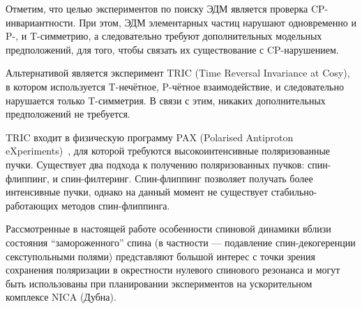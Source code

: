 
Отметим, что целью экспериментов по поиску ЭДМ является проверка CP-инвариантности. При этом, ЭДМ элементарных частиц нарушают одновременно и P-, и T-симметрию, а следовательно требуют дополнительных модельных предположений, для того, чтобы связать их существование с CP-нарушением.~\cite[стр.~1926]{Aksentev:TRIC}

Альтернативой является эксперимент TRIC (Time Reversal Invariance at Cosy),~\cite{Aksentev:TRIC} в котором используется T-нечётное, P-чётное взаимодействие, и следовательно нарушается только T-симметрия. В связи с этим, никаких дополнительных предположений не требуется.

TRIC входит в физическую программу PAX (Polarised Antiproton eXperiments)~\cite{Aksentev:PAX}, для которой требуются высокоинтенсивные поляризованные пучки. Существует два подхода к получению поляризованных пучков: спин-флиппинг, и спин-филтеринг. Спин-флиппинг позволяет получать более интенсивные пучки, однако на данный момент не существует стабильно-работающих методов спин-флиппинга.

Рассмотренные в настоящей работе особенности спиновой динамики вблизи состояния ``замороженного'' спина (в частности --- подавление спин-декогеренции секступольными полями) представляют большой интерес с точки зрения сохранения поляризации в окрестности нулевого спинового резонанса и могут быть использованы при планировании экспериментов на ускорительном комплексе NICA (Дубна).